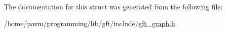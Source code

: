 The documentation for this struct was generated from the following file\-:\begin{DoxyCompactItemize}
\item 
/home/pavm/programming/lib/gft/include/\hyperlink{gft__graph_8h}{gft\-\_\-graph.\-h}\end{DoxyCompactItemize}
